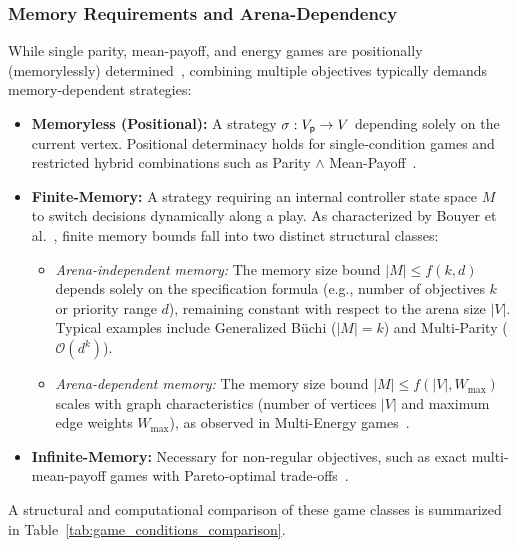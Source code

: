 \documentclass{article}
\begin{document}
\subsubsection{Memory Requirements and Arena-Dependency}
While single parity, mean-payoff, and energy games are positionally (memorylessly) determined~\cite{ChatterjeeHJ05,Chatterjee:2010EP}, combining multiple objectives typically demands memory-dependent strategies:
\begin{itemize}
    \item \textbf{Memoryless (Positional):} A strategy $\sigma: V_{\mathsf{p}} \to V$ depending solely on the current vertex. Positional determinacy holds for single-condition games and restricted hybrid combinations such as Parity $\land$ Mean-Payoff~\cite{ChatterjeeHJ05}.
    \item \textbf{Finite-Memory:} A strategy requiring an internal controller state space $M$ to switch decisions dynamically along a play. As characterized by Bouyer et al.~\cite{Bouyer:2022}, finite memory bounds fall into two distinct structural classes:
    \begin{itemize}
        \item \textit{Arena-independent memory:} The memory size bound $|M| \le f(k, d)$ depends solely on the specification formula (e.g., number of objectives $k$ or priority range $d$), remaining constant with respect to the arena size $|V|$. Typical examples include Generalized Büchi ($|M| = k$) and Multi-Parity ($\mathcal{O}(d^k)$).
        \item \textit{Arena-dependent memory:} The memory size bound $|M| \le f(|V|, W_{\max})$ scales with graph characteristics (number of vertices $|V|$ and maximum edge weights $W_{\max}$), as observed in Multi-Energy games~\cite{Velner:2015}.
    \end{itemize}
    \item \textbf{Infinite-Memory:} Necessary for non-regular objectives, such as exact multi-mean-payoff games with Pareto-optimal trade-offs~\cite{Velner:2015}.
\end{itemize}

A structural and computational comparison of these game classes is summarized in Table~\ref{tab:game_conditions_comparison}.
\end{document}
